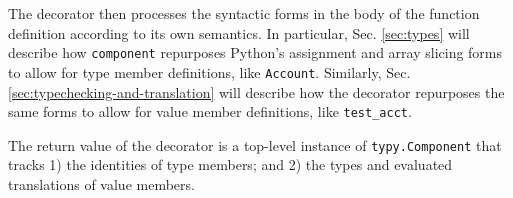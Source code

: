 \documentclass[10pt]{sigplanconf}
\newcommand{\typy}{\texttt{\footnotesize typy}}
\newcommand{\lip}[1]{\lstinline[language=Python,basicstyle=\ttfamily\footnotesize,morekeywords={with},deletendkeywords={tuple,buffer,map}]{#1}}
\newcommand{\li}[1]{\lip{#1}}
\begin{document}
The decorator then processes the syntactic forms in the body of the function definition according to its own semantics. In particular, Sec. \ref{sec:types} will describe how \lip{component} repurposes Python's assignment and array slicing forms to allow for type member definitions, like \li{Account}. Similarly, Sec. \ref{sec:typechecking-and-translation} will describe how the decorator repurposes the same forms to allow for value member definitions, like \li{test_acct}. 

The return value of the decorator is a top-level instance of \lip{typy.Component} that tracks 1) the identities of type members; and 2) the types and evaluated translations of value members. %

%


\end{document}
